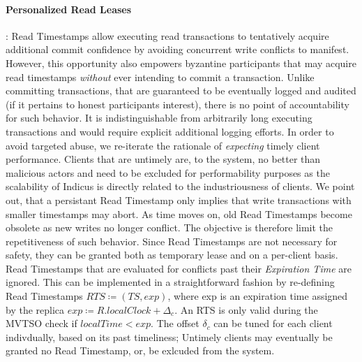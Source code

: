 \paragraph{Personalized Read Leases}: 
Read Timestamps allow executing read transactions to tentatively acquire additional commit confidence by avoiding concurrent write conflicts to manifest. However, this opportunity also empowers byzantine participants that may acquire read timestamps \textit{without} ever intending to commit a transaction. Unlike committing transactions, that are guaranteed to be eventually logged and audited (if it pertains to honest participants interest), there is no point of accountability for such behavior. It is indistinguishable from arbitrarily long executing transactions and would require explicit additional logging efforts. In order to avoid targeted abuse, we re-iterate the rationale of \textit{expecting} timely client performance. Clients that are untimely are, to the system, no better than malicious actors and need to be excluded for performability purposes as the scalability of Indicus is directly related to the industriousness of clients. 
We point out, that a persistant Read Timestamp only implies that write transactions with smaller timestamps may abort. As time moves on, old Read Timestamps become obsolete as new writes no longer conflict. The objective is therefore limit the repetitiveness of such behavior.
Since Read Timestamps are not necessary for safety, they can be granted both as temporary lease and on a per-client basis. Read Timestamps that are evaluated for conflicts past their \textit{Expiration Time} are ignored. This can be implemented in a straightforward fashion by re-defining Read Timestamps $RTS \coloneqq (TS, exp )$, where exp is an expiration time assigned by the replica $exp \coloneqq R.localClock + \Delta_c$. An RTS is only valid during the MVTSO check if $localTime < exp$. The offset $\delta_c$ can be tuned for each client indivdually, based on its past timeliness; Untimely clients may eventually be granted no Read Timestamp, or, be exlcuded from the system.





